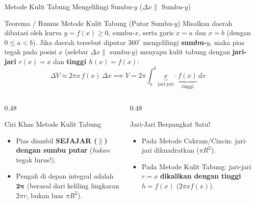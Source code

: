\documentclass[aspectratio=43,10pt]{beamer}
\begin{document}
\begin{frame}{Metode Kulit Tabung Mengelilingi Sumbu-$y$ ($\Delta x \parallel$ Sumbu-$y$)}
    \begin{block}{Teorema / Rumus Metode Kulit Tabung (Putar Sumbu-$y$)}
        \scriptsize\abovedisplayskip=3pt\belowdisplayskip=3pt
        Misalkan daerah dibatasi oleh kurva $y = f(x) \ge 0$, sumbu-$x$, serta garis $x = a$ dan $x = b$ (dengan $0 \le a < b$). Jika daerah tersebut diputar $360^\circ$ mengelilingi \textbf{sumbu-$y$}, maka pias tegak pada posisi $x$ (selebar $\Delta x \parallel$ sumbu-$y$) menyapu kulit tabung dengan \textbf{jari-jari $r(x) = x$} dan \textbf{tinggi $h(x) = f(x)$}:
        $$\boxed{\;\Delta V \approx 2\pi x\,f(x)\,\Delta x \implies V = 2\pi\int_{a}^{b} \underbrace{x}_{\text{jari-jari}}\cdot\underbrace{f(x)}_{\text{tinggi}}\,dx\;}$$
    \end{block}

    \begin{columns}[T]
        \begin{column}{0.48\textwidth}
            \begin{exampleblock}{Ciri Khas Metode Kulit Tabung}
                \scriptsize
                \begin{itemize}\itemsep=2pt
                    \item Pias diambil \textbf{SEJAJAR ($\parallel$) dengan sumbu putar} (\textit{bukan} tegak lurus!).
                    \item Pengali di depan integral adalah $\mathbf{2\pi}$ (berasal dari keliling lingkaran $2\pi r$, bukan luas $\pi R^2$).
                \end{itemize}
            \end{exampleblock}
        \end{column}

        \begin{column}{0.48\textwidth}
            \begin{alertblock}{Jari-Jari Berpangkat Satu!}
                \scriptsize
                \begin{itemize}\itemsep=2pt
                    \item Pada Metode Cakram/Cincin: jari-jari dikuadratkan ($\pi R^2$).
                    \item Pada Metode Kulit Tabung: jari-jari $r = x$ \textbf{dikalikan dengan tinggi $h = f(x)$} ($2\pi x f(x)$).
                \end{itemize}
            \end{alertblock}
        \end{column}
    \end{columns}
\end{frame}
\end{document}
